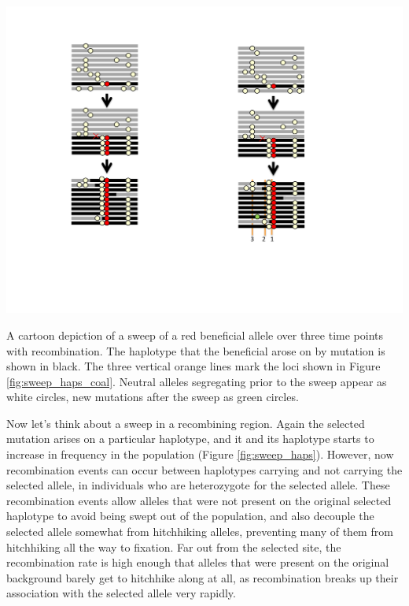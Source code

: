 \begin{marginfigure}
\begin{center}
\includegraphics[width= 0.5 \textwidth]{figures/Hitchhiking/recom_haps_sweep.pdf}
\end{center}
\caption{A cartoon depiction of a sweep of a red beneficial allele
  over three time points with recombination. The haplotype that the beneficial arose on by mutation is shown in black. The three vertical orange lines mark the loci shown in Figure \ref{fig:sweep_haps_coal}. Neutral alleles segregating prior to the sweep appear as white circles, new mutations after the sweep as green circles.} \label{fig:sweep_haps}
\end{marginfigure}
Now let's think about a sweep in a recombining region. Again the
selected mutation arises on a particular haplotype, and it and its
haplotype starts to increase in frequency in the population (Figure \ref{fig:sweep_haps}). However,
now recombination events can occur between haplotypes carrying and not
carrying the selected allele, in individuals who are heterozygote for
the selected allele. These recombination events allow alleles that
were not present on the original selected haplotype to avoid being
swept out of the population, and also decouple the selected allele
somewhat from hitchhiking alleles, preventing many of them from hitchhiking all the way to fixation. Far out from the selected site, the recombination
rate is high enough that alleles that were present on the original
background barely get to hitchhike along at all, as recombination breaks up their association with the selected allele very rapidly.

